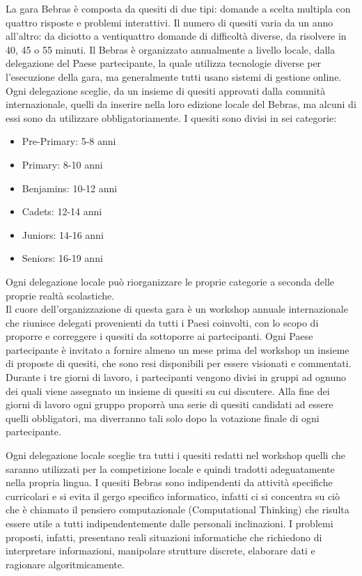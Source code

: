\documentclass[12pt]{report}
\begin{document}
La gara Bebras è composta da quesiti di due tipi: domande a scelta multipla con quattro risposte e problemi interattivi. Il numero di quesiti varia da un anno all'altro: da diciotto a ventiquattro domande di difficoltà diverse, da risolvere in 40, 45 o 55 minuti.
Il Bebras è organizzato annualmente a livello locale, dalla delegazione del Paese partecipante, la quale utilizza tecnologie diverse per l'esecuzione della gara, ma generalmente tutti usano sistemi di gestione online.
Ogni delegazione sceglie, da un insieme di quesiti approvati dalla comunità internazionale, quelli da inserire nella loro edizione locale del Bebras, ma alcuni di essi sono da utilizzare obbligatoriamente.
\newpage
I quesiti sono divisi in sei categorie:
\begin{itemize}
\item Pre-Primary: 5-8 anni
\item Primary: 8-10 anni
\item Benjamins: 10-12 anni
\item Cadets: 12-14 anni
\item Juniors: 14-16 anni
\item  Seniors: 16-19 anni
\end{itemize}
Ogni delegazione locale può riorganizzare le proprie categorie a seconda delle proprie realtà scolastiche.
\\

Il cuore dell'organizzazione di questa gara è un workshop annuale internazionale che riunisce delegati provenienti da tutti i Paesi coinvolti, con lo scopo di proporre e correggere i quesiti da sottoporre ai partecipanti.  
Ogni Paese partecipante è invitato a fornire almeno un mese prima del workshop un insieme di proposte di quesiti, che sono resi disponibili per essere visionati e commentati. Durante i tre giorni di lavoro, i partecipanti vengono divisi in gruppi ad ognuno dei quali viene assegnato un insieme di quesiti su cui discutere. Alla fine dei giorni di lavoro ogni gruppo proporrà una serie di quesiti candidati ad essere quelli obbligatori, ma diverranno tali solo dopo la votazione finale di ogni partecipante.

Ogni delegazione locale sceglie tra tutti i quesiti redatti nel workshop quelli che saranno utilizzati per la competizione locale e quindi tradotti adeguatamente nella propria lingua.
I quesiti Bebras sono indipendenti da attività specifiche curricolari e si evita il gergo specifico informatico, infatti ci si concentra su ciò che è chiamato il pensiero computazionale (Computational Thinking) che risulta essere utile a tutti indipendentemente dalle personali inclinazioni. I problemi proposti, infatti, presentano reali situazioni informatiche che richiedono di interpretare informazioni, manipolare strutture discrete, elaborare dati e ragionare algoritmicamente.
%
%
\end{document}
